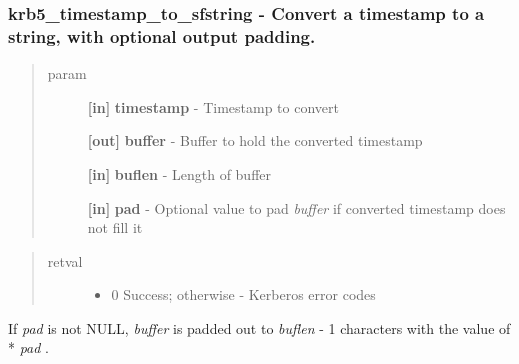 \documentclass[letterpaper,10pt,english]{sphinxmanual}
\begin{document}
\subsubsection{krb5\_timestamp\_to\_sfstring -  Convert a timestamp to a string, with optional output padding.}
\label{appdev/refs/api/krb5_timestamp_to_sfstring:krb5-timestamp-to-sfstring-convert-a-timestamp-to-a-string-with-optional-output-padding}\label{appdev/refs/api/krb5_timestamp_to_sfstring::doc}

\begin{fulllineitems}
\label{appdev/refs/api/krb5_timestamp_to_sfstring:c.krb5_timestamp_to_sfstring}
\end{fulllineitems}

\begin{quote}\begin{description}
\item[{param}] \leavevmode
\textbf{{[}in{]}} \textbf{timestamp} - Timestamp to convert

\textbf{{[}out{]}} \textbf{buffer} - Buffer to hold the converted timestamp

\textbf{{[}in{]}} \textbf{buflen} - Length of buffer

\textbf{{[}in{]}} \textbf{pad} - Optional value to pad \emph{buffer} if converted timestamp does not fill it

\end{description}\end{quote}
\begin{quote}\begin{description}
\item[{retval}] \leavevmode\begin{itemize}
\item {} 
0   Success; otherwise - Kerberos error codes

\end{itemize}

\end{description}\end{quote}

If \emph{pad} is not NULL, \emph{buffer} is padded out to \emph{buflen} - 1 characters with the value of * \emph{pad} .
\end{document}
